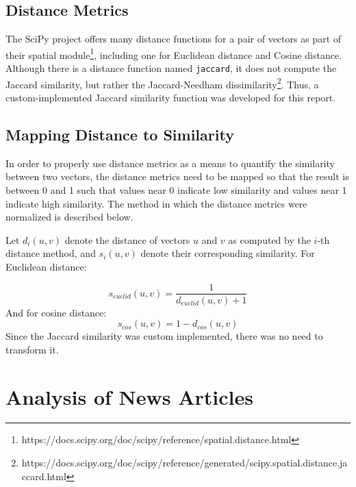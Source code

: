 \documentclass[11pt]{article}
\begin{document}
\subsection{Distance Metrics}

The SciPy project offers many distance functions for a pair of vectors as part of their spatial module\footnote{
https://docs.scipy.org/doc/scipy/reference/spatial.distance.html
}, including one for Euclidean distance %
and Cosine distance. %
Although there is a distance function named \texttt{jaccard}, it does not compute the Jaccard similarity, but rather the Jaccard-Needham dissimilarity\footnote{
https://docs.scipy.org/doc/scipy/reference/generated/scipy.spatial.distance.jaccard.html
}.
Thus, a custom-implemented Jaccard similarity function was developed for this report.


\subsection{Mapping Distance to Similarity}

In order to properly use distance metrics as a means to quantify the similarity between two vectors, the distance metrics need to be mapped so that the result is between 0 and 1 such that values near 0 indicate low similarity and values near 1 indicate high similarity. The method in which the distance metrics were normalized is described below.

Let $d_i(u, v)$ denote the distance of vectors $u$ and $v$ as computed by the $i$-th distance method, and $s_i(u, v)$ denote their corresponding similarity.
For Euclidean distance:

\begin{equation} \label{eq:euclid}
s_{euclid}(u, v) = \frac{1}{d_{euclid}(u, v) + 1}
\end{equation}
And for cosine distance:
\begin{equation} \label{eq:cosine}
s_{cos}(u, v) = 1 - d_{cos}(u, v)
\end{equation}
Since the Jaccard similarity was custom implemented, there was no need to transform it.


\section{Analysis of News Articles}
\end{document}
